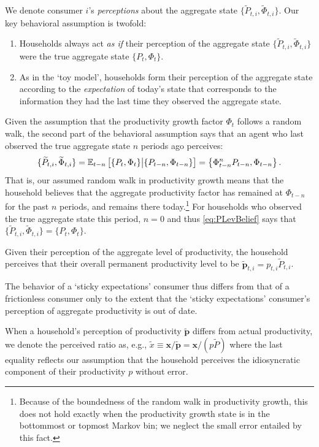 \documentclass[titlepage]{./econtex}
\begin{document}
We denote consumer $i$'s \textit{perceptions} about the aggregate state $\{\widetilde{P}_{t,i},\widetilde{\Phi}_{t,i}\}$.  Our key behavioral assumption is twofold:
\begin{enumerate}
\item Households always act \textit{as if} their perception of the aggregate state $\{\widetilde{P}_{t,i},\widetilde{\Phi}_{t,i}\}$ were the true aggregate state $\{P_t,\Phi_t\}$.

\item As in the `toy model', households form their perception of the aggregate state according to the \textit{expectation} of today's state that corresponds to the information they had the last time they observed the aggregate state.
\end{enumerate}
Given the assumption that the productivity growth factor $\Phi_t$ follows a random walk,
the second part of the behavioral assumption says that an agent who last observed the true
aggregate state $n$ periods ago perceives:
\begin{equation}\label{eq:PLevBelief}
\{\widetilde{P}_{t,i},\widetilde{\Phi}_{t,i}\} = \operatorname{\mathbb{E}}_{t-n}\big[\{P_t,\Phi_t\} \big| \{P_{t-n},\Phi_{t-n}\}\big] = \left\{\Phi_{t-n}^{n} P_{t-n},\Phi_{t-n}\right\}.
\end{equation}
That is, our assumed random walk in productivity growth means that the household believes that the aggregate productivity factor has remained at $\Phi_{t-n}$ for the past $n$ periods, and remains there today.\footnote{Because of the boundedness of the random walk in productivity growth, this does not hold exactly when the productivity growth state is in the bottommost or topmost Markov bin; we neglect the small error entailed by this fact.}  For households who observed the true aggregate state this period, $n=0$ and thus \eqref{eq:PLevBelief} says that $\{\widetilde{P}_{t,i},\widetilde{\Phi}_{t,i}\} = \{P_t,\Phi_t\}$.

Given their perception of the aggregate level of productivity, the household perceives that their overall permanent productivity level to be $\widetilde{\pmb{p}}_{t,i} = p_{t,i} \widetilde{P}_{t,i}$.

The behavior of a `sticky expectations' consumer thus differs from that of a frictionless consumer only to the extent that the `sticky expectations' consumer's perception of aggregate productivity is out of date.

When a household's perception of productivity $\widetilde{\pmb{p}}$ differs from actual productivity, we denote the perceived ratio as, e.g., $\widetilde{x} \equiv \mathbf{x}/\widetilde{\pmb{p}} = \mathbf{x}/({p}\widetilde{P})$ where the last equality reflects our assumption that the household perceives the idiosyncratic component of their productivity ${p}$ without error.
\end{document}
